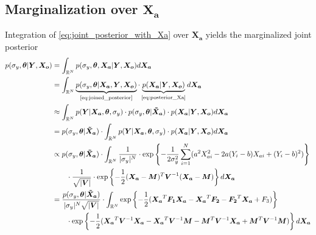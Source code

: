\documentclass[10pt]{article}
\renewcommand{\vec}[1]{\boldsymbol{#1}}
\newcommand{\mat}[1]{\boldsymbol{#1}}
\begin{document}
\subsection{Marginalization over $\vec{X_a}$}
Integration of \cref{eq:joint_posterior_with_Xa} over $\vec{X_a}$ yields the marginalized joint posterior
{\tiny
\begin{align}
    p(\sigma_y, \vec{\theta} | \vec{Y}, \vec{X_o}) &= \int_{\mathbb{R}^N} p(\sigma_y, \vec{\theta}, \vec{X_a} | \vec{Y}, \vec{X_o}) d\vec{X_a} \\
    
    &= \int_{\mathbb{R}^N} 
        \underbrace{p(\sigma_y, \vec{\theta} | \vec{X_a}, \vec{Y}, \vec{X_o})}_{\text{\cref{eq:joined_posterior}}} \cdot 
        \underbrace{p(\vec{X_a} | \vec{Y}, \vec{X_o})}_{\text{\cref{eq:posterior_Xa}}} d\vec{X_a} \\
    
    &\approx \int_{\mathbb{R}^N} 
        p(\vec{Y} | \vec{X_a}, \vec{\theta}, \sigma_y) \cdot 
        p(\sigma_y, \vec{\theta} | \vec{\tilde{X}_a}) \cdot 
        p(\vec{X_a} | \vec{Y}, \vec{X_o}) d\vec{X_a} \\
    
    &= p(\sigma_y, \vec{\theta} | \vec{\tilde{X}_a}) \cdot 
    \int_{\mathbb{R}^N} 
        p(\vec{Y} | \vec{X_a}, \vec{\theta}, \sigma_y) \cdot 
        p(\vec{X_a} | \vec{Y}, \vec{X_o}) d\vec{X_a} \\
        
    &\propto p(\sigma_y, \vec{\theta} | \vec{\tilde{X}_a}) \cdot 
    \int_{\mathbb{R}^N} 
        \frac{1}{|\sigma_y|^N} \cdot 
        \exp\left\{- \frac{1}{2\sigma_y^2} \sum_{i=1}^N (a^2 X_{ai}^2  - 2 a (Y_i - b) X_{ai} + (Y_i - b)^2) \right\} \nonumber \\
    &   \qquad \cdot 
        \frac{1}{\sqrt{|\mat{V}|}} \cdot
        \exp\left\{- \frac{1}{2} (\vec{X_a} - \vec{M})^T \mat{V}^{-1} (\vec{X_a} - \vec{M}) \right\} d\vec{X_a} \\
        
    &= \frac{p(\sigma_y, \vec{\theta} | \vec{\tilde{X}_a})}{|\sigma_y|^N \sqrt{|\mat{V}|}} \cdot 
    \int_{\mathbb{R}^N} 
        \exp\left\{- \frac{1}{2} (\vec{X_a}^T \mat{F_1} \vec{X_a} - \vec{X_a}^T \vec{F_2} - \vec{F_2}^T \vec{X_a} + F_3) \right\}\nonumber \\
    &   \qquad  \cdot 
        \exp\left\{- \frac{1}{2} (\vec{X_a}^T \mat{V}^{-1} \vec{X_a} - \vec{X_a}^T \mat{V}^{-1} \vec{M} - \vec{M}^T \mat{V}^{-1} \vec{X_a} + \vec{M}^T \mat{V}^{-1} \vec{M}) \right\} d\vec{X_a} \\
        

\end{align}}
\end{document}
